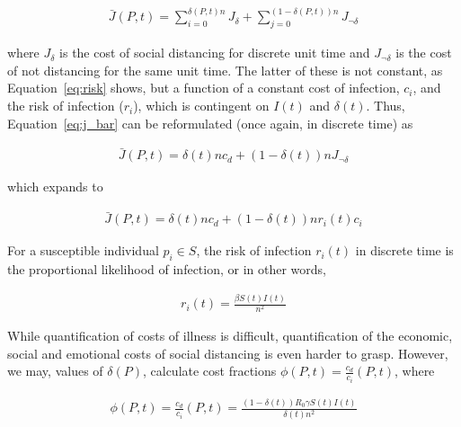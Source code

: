 \documentclass{article}
\begin{document}
\begin{equation}
	\begin{aligned}
		\bar{J}(P, t) = \sum_{i=0}^{\delta(P, t) n} J_{\delta} + \sum_{j=0}^{(1-\delta(P, t)) n} J_{\lnot \delta}
	\end{aligned}
	\label{eq:j_bar}
\end{equation}

\noindent where $J_{\delta}$ is the cost of social distancing for discrete unit time and $J_{\lnot \delta}$ is the cost of not distancing for the same unit time. The latter of these is not constant, as Equation~\eqref{eq:risk} shows, but a function of a constant cost of infection, $c_i$, and the risk of infection ($r_i$), which is contingent on $I(t)$ and $\delta(t)$. Thus, Equation~\eqref{eq:j_bar} can be reformulated (once again, in discrete time) as

\begin{equation}
	\begin{aligned}
		\bar{J}(P, t) = \delta(t) n c_d + (1 - \delta(t)) n J_{\lnot \delta}
	\end{aligned}
\end{equation}

\noindent which expands to

\begin{equation}
	\begin{aligned}
		\bar{J}(P, t) = \delta(t) n c_d + (1 - \delta(t)) n r_i(t) c_i
	\end{aligned}
\end{equation}

For a susceptible individual $p_i \in S$, the risk of infection $r_i(t)$ in discrete time is the proportional likelihood of infection, or in other words, 

\begin{equation}
	\begin{aligned}
		r_i(t) = \frac{\beta S(t) I(t)}{n^2}
	\end{aligned}
\end{equation}

While quantification of costs of illness is difficult, quantification of the economic, social and emotional costs of social distancing is even harder to grasp. However, we may, values of $\delta(P)$, calculate cost fractions $\phi(P, t) = \frac{c_d}{c_i}(P, t)$, where

\begin{equation}
	\begin{aligned}
		\phi(P, t) = \frac{c_d}{c_i}(P, t) = \frac{(1 - \delta(t)) R_0 \gamma S(t) I(t)}{\delta(t) n^2}
	\end{aligned}
	\label{eq:cost_fraction}
\end{equation}
\end{document}
